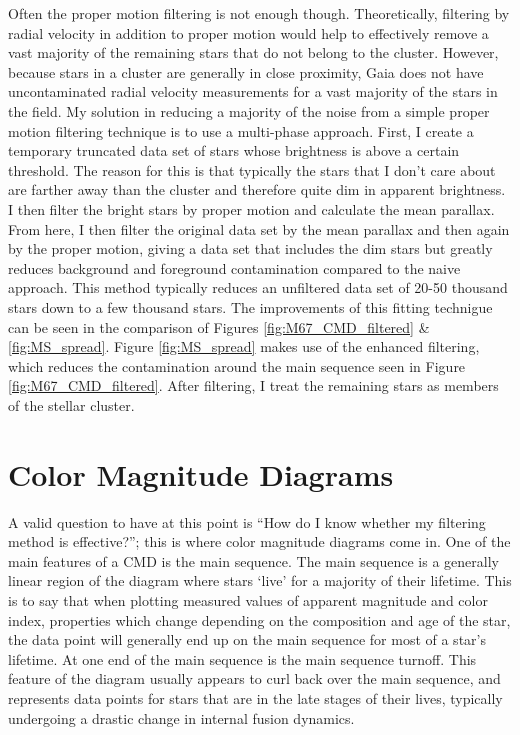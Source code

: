 \documentclass[aps,prb,twocolumn,groupedaddress,nofootinbib,floatfix]{revtex4-1}
\begin{document}
Often the proper motion filtering is not enough though. Theoretically, filtering by radial velocity in addition to proper motion would help to effectively remove a vast majority of the remaining stars that do not belong to the cluster. However, because stars in a cluster are generally in close proximity, Gaia does not have uncontaminated radial velocity measurements for a vast majority of the stars in the field. My solution in reducing a majority of the noise from a simple proper motion filtering technique is to use a multi-phase approach. First, I create a temporary truncated data set of stars whose brightness is above a certain threshold. The reason for this is that typically the stars that I don't care about are farther away than the cluster and therefore quite dim in apparent brightness. I then filter the bright stars by proper motion and calculate the mean parallax. From here, I then filter the original data set by the mean parallax and then again by the proper motion, giving a data set that includes the dim stars but greatly reduces background and foreground contamination compared to the naive approach. This method typically reduces an unfiltered data set of 20-50 thousand stars down to a few thousand stars. The improvements of this fitting technigue can be seen in the comparison of Figures \ref{fig:M67_CMD_filtered} \& \ref{fig:MS_spread}. Figure \ref{fig:MS_spread} makes use of the enhanced filtering, which reduces the contamination around the main sequence seen in Figure \ref{fig:M67_CMD_filtered}. After filtering, I treat the remaining stars as members of the stellar cluster.

\section*{Color Magnitude Diagrams}
A valid question to have at this point is ``How do I know whether my filtering method is effective?''; this is where color magnitude diagrams come in. One of the main features of a CMD is the main sequence. The main sequence is a generally linear region of the diagram where stars `live' for a majority of their lifetime. This is to say that when plotting measured values of apparent magnitude and color index, properties which change depending on the composition and age of the star, the data point will generally end up on the main sequence for most of a star's lifetime. At one end of the main sequence is the main sequence turnoff. This feature of the diagram usually appears to curl back over the main sequence, and represents data points for stars that are in the late stages of their lives, typically undergoing a drastic change in internal fusion dynamics. 
\end{document}
